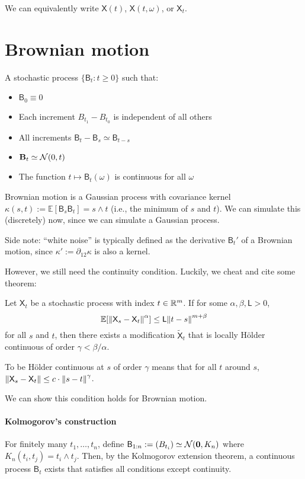 \documentclass[notes]{agony}
\newcommand{\E}{\mathbb{E}}
\newcommand{\rv}{\mathsf}
\renewcommand{\N}{\mathcal{N}}
\begin{document}
We can equivalently write $\rv X(t)$, $\rv X(t,\omega)$, or $\rv X_t$.

\section{Brownian motion}

\begin{defn}
	A stochastic process $\{\rv B_t : t \geq 0\}$ such that:
	\begin{itemize}[nosep]
		\item $\rv B_0 \equiv 0$
		\item Each increment $B_{t_1} - B_{t_0}$ is independent of all others
		\item All increments $\rv B_t - \rv B_s \simeq \rv B_{t-s}$
		\item $\vb B_t \simeq \N(0,t)$
		\item The function $t \mapsto \rv B_t(\omega)$ is continuous for all $\omega$
	\end{itemize}
\end{defn}

Brownian motion is a Gaussian process with covariance kernel
$\kappa(s,t) := \E[\rv B_s\rv B_t] = s \wedge t$
(i.e., the minimum of $s$ and $t$).
We can simulate this (discretely) now, since we can simulate a Gaussian process.

Side note: ``white noise'' is typically defined as the derivative $\rv B_t'$
of a Brownian motion, since $\kappa' := \partial_{12}\kappa$ is also a kernel.

However, we still need the continuity condition.
Luckily, we cheat and cite some theorem:

\begin{theorem}
	Let $\rv X_t$ be a stochastic process with index $t \in \mathbb{R}^m$.
	If for some $\alpha,\beta,\rv L > 0$,
	\[ \E[\norm{\rv X_s - \rv X_t}^\alpha] \leq \rv L\norm{t-s}^{m+\beta} \]
	for all $s$ and $t$,
	then there exists a modification $\tilde{\rv{X}}_t$
	that is locally Hölder continuous of order $\gamma < \beta/\alpha$.
\end{theorem}
To be Hölder continuous at $s$ of order $\gamma$
means that for all $t$ around $s$, $\norm{\rv X_s - \rv X_t} \leq c\cdot\norm{s-t}^\gamma$.

We can show this condition holds for Brownian motion.

\paragraph{Kolmogorov's construction}
For finitely many $t_1,\dotsc,t_n$,
define $\rv B_{1:n} := (B_{t_i}) \simeq \mathcal N(\vb 0, K_n)$
where $K_n(t_i,t_j) = t_i \wedge t_j$.
Then, by the Kolmogorov extension theorem,
a continuous process $\rv B_t$ exists that satisfies all conditions
except continuity.
\end{document}

